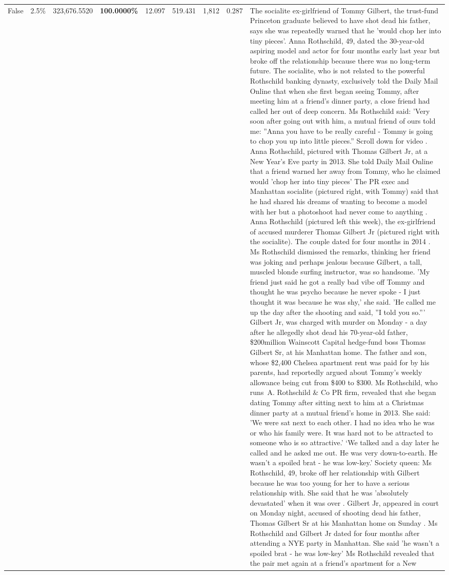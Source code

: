 \begin{table}[H]
\begin{tabular}{lllrlllll}
False & 2.5\% & 323,676.5520 & \bfseries \color{red} 100.0000\% & 12.097 & 519.431 & 1,812 & 0.287 & The socialite ex-girlfriend of Tommy Gilbert, the trust-fund Princeton graduate believed to have shot dead his father, says she was repeatedly warned that he 'would chop her into tiny pieces'. Anna Rothschild, 49, dated the 30-year-old aspiring model and actor for four months early last year but broke off the relationship because there was no long-term future. The socialite, who is not related to the powerful Rothschild banking dynasty, exclusively told the Daily Mail Online that when she first began seeing Tommy, after meeting him at a friend's dinner party, a close friend had called her out of deep concern. Ms Rothschild said: 'Very soon after going out with him, a mutual friend of ours told me: ''Anna you have to be really careful - Tommy is going to chop you up into little pieces.'' Scroll down for video . Anna Rothschild, pictured with Thomas Gilbert Jr, at a New Year's Eve party in 2013. She told Daily Mail Online that a friend warned her away from Tommy, who he claimed would 'chop her into tiny pieces' The PR exec and Manhattan socialite (pictured right, with Tommy) said that he had shared his dreams of wanting to become a model with her but a photoshoot had never come to anything . Anna Rothschild (pictured left this week), the ex-girlfriend of accused murderer Thomas Gilbert Jr (pictured right with the socialite). The couple dated for four months in 2014 . Ms Rothschild dismissed the remarks, thinking her friend was joking and perhaps jealous because Gilbert, a tall, muscled blonde surfing instructor, was so handsome. 'My friend just said he got a really bad vibe off Tommy and thought he was psycho because he never spoke - I just thought it was because he was shy,' she said. 'He called me up the day after the shooting and said, ''I told you so.''' Gilbert Jr, was charged with murder on Monday - a day after he allegedly shot dead his 70-year-old father, \$200million Wainscott Capital hedge-fund boss Thomas Gilbert Sr, at his Manhattan home. The father and son, whose \$2,400 Chelsea apartment rent was paid for by his parents, had reportedly argued about Tommy's weekly allowance being cut from \$400 to \$300. Ms Rothschild, who runs A. Rothschild \& Co PR firm, revealed that she began dating Tommy after sitting next to him at a Christmas dinner party at a mutual friend's home in 2013. She said: 'We were sat next to each other. I had no idea who he was or who his family were. It was hard not to be attracted to someone who is so attractive.' ‘We talked and a day later he called and he asked me out. He was very down-to-earth. He wasn’t a spoiled brat - he was low-key.’ Society queen: Ms Rothschild, 49, broke off her relationship with Gilbert because he was too young for her to have a serious relationship with. She said that he was 'absolutely devastated' when it was over . Gilbert Jr, appeared in court on Monday night, accused of shooting dead his father, Thomas Gilbert Sr at his Manhattan home on Sunday . Ms Rothschild and Gilbert Jr dated for four months after attending a NYE party in Manhattan. She said 'he wasn't a spoiled brat - he was low-key' Ms Rothschild revealed that the pair met again at a friend’s apartment for a New 
\end{tabular}
\end{table}

